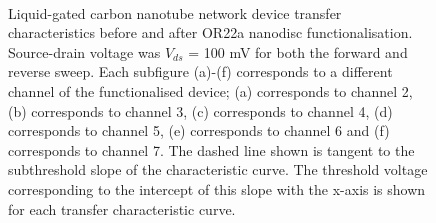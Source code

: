 \documentclass[
  a4paper,
]{scrbook}
\begin{document}
\begin{figure}
\begin{minipage}[t]{0.45\linewidth}
{{}

}

\end{minipage}%
%
\begin{minipage}[t]{0.01\linewidth}

{\centering 

~

}

\end{minipage}%

\caption{\label{fig-OR22a-variability-TX}Liquid-gated carbon nanotube
network device transfer characteristics before and after OR22a nanodisc
functionalisation. Source-drain voltage was \(V_{ds}\) = 100 mV for both
the forward and reverse sweep. Each subfigure (a)-(f) corresponds to a
different channel of the functionalised device; (a) corresponds to
channel 2, (b) corresponds to channel 3, (c) corresponds to channel 4,
(d) corresponds to channel 5, (e) corresponds to channel 6 and (f)
corresponds to channel 7. The dashed line shown is tangent to the
subthreshold slope of the characteristic curve. The threshold voltage
corresponding to the intercept of this slope with the x-axis is shown
for each transfer characteristic curve.}

\end{figure}
\end{document}

